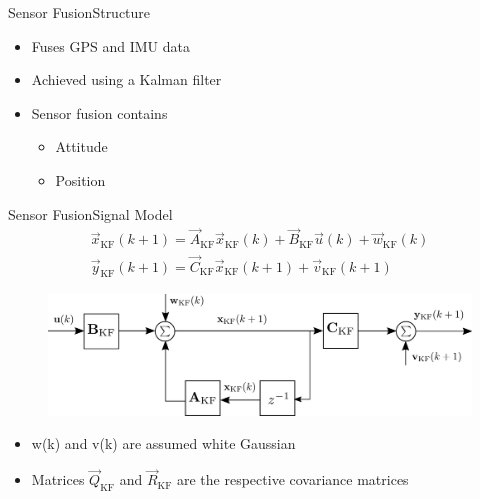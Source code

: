 \begin{frame}{Sensor Fusion}{Structure}
	\begin{itemize}

		\item Fuses GPS and IMU data
		\item Achieved using a Kalman filter
		\item Sensor fusion contains
			\begin{itemize}
		\item Attitude
		\item Position
			\end{itemize}
	\end{itemize}

\end{frame}
\begin{frame}{Sensor Fusion}{Signal Model}
	\begin{gather*}
    \vec{x}_\mathrm{KF}(k+1) = \vec{A}_\mathrm{KF}\vec{x}_\mathrm{KF}(k) + \vec{B}_\mathrm{KF} \vec{u}(k) + \vec{w}_\mathrm{KF}(k)  \nonumber \\
    \vec{y}_\mathrm{KF}(k+1) = \vec{C}_\mathrm{KF} \vec{x}_\mathrm{KF}(k+1) + \vec{v}_\mathrm{KF}(k+1)  \nonumber
    \end{gather*}
    \begin{figure}[H]
        \centering
        \includegraphics[width=.7\linewidth]{figures/signalModel}
    \end{figure}
	\begin{itemize}
		\item w(k) and v(k) are assumed white Gaussian
		\item Matrices $\vec{Q}_\mathrm{KF}$ and $\vec{R}_\mathrm{KF}$ are the respective covariance matrices
	\end{itemize}

\end{frame}


